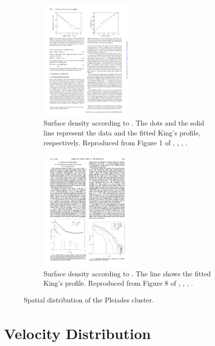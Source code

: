 \begin{figure}[ht!]
    \centering
    \begin{subfigure}[t]{0.49\textwidth} \centering
        \includegraphics[height=6cm]{background/Figures/F1_Converse2010.pdf}
        \caption{Surface density according to \citet{Converse2010}. The dots and the solid line represent the data and the fitted King's profile, respectively. Reproduced from Figure 1 of \citet{Converse2010}, \textit{}, , .}
        \label{fig:spatialConverse}
    \end{subfigure}
    \begin{subfigure}[t]{0.49\textwidth} \centering
       \includegraphics[height=6cm]{background/Figures/F8_Adams2001.pdf}
        \caption{Surface density according to \citet{Adams2001}. The line shows the fitted King's profile. Reproduced from Figure 8 of \citet{Adams2001}, \textit{}, , .}
        \label{fig:spatialAdams} 
    \end{subfigure}
    \caption{Spatial distribution of the Pleiades cluster.}
\end{figure}

  
\section{Velocity Distribution}

